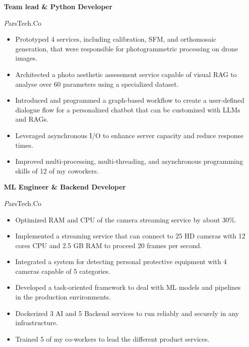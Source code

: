 \begin{rubric}{}


\entry*[2023 - 2025]%
	\textbf{Team lead \& Python Developer} \par {\emph ParsTech.Co}
        \begin{itemize}
          \setlength{\itemsep}{0ex} %
          \setlength{\parskip}{1pt}     %
            \item Prototyped 4 services, including calibration, SFM, and orthomosaic generation, that were responsible for photogrammetric processing on drone images.
            \item Architected a photo aesthetic assessment service capable of visual RAG to analyse over 60 parameters using a specialized dataset. 
            \item Introduced and programmed a graph-based workflow to create a user-defined dialogue flow for a personalized chatbot that can be customized with LLMs and RAGs.
            \item Leveraged asynchronous I/O to enhance server capacity and reduce response times.
            \item Improved multi-processing, multi-threading, and asynchronous programming skills of 12 of my coworkers.
        \end{itemize}


\entry*[2021 -- 2023]%
	\textbf{ML Engineer \& Backend Developer} \par {\emph ParsTech.Co}
        \begin{itemize}
          \setlength{\itemsep}{0ex} %
          \setlength{\parskip}{1pt}     %
          \item Optimized RAM and CPU of the camera streaming service by about 30\%.
          \item Implemented a streaming service that can connect to 25 HD cameras with 12 cores CPU and 2.5 GB RAM to proceed 20 frames per second.
          \item Integrated a system for detecting personal protective equipment with 4 cameras capable of 5 categories.
          \item Developed a task-oriented framework to deal with ML models and pipelines in the production environments.
          \item Dockerized 3 AI and 5 Backend services to run reliably and securely in any infrastructure.
          \item Trained 5 of my co-workers to lead the different product services.
        \end{itemize}




\end{rubric}

